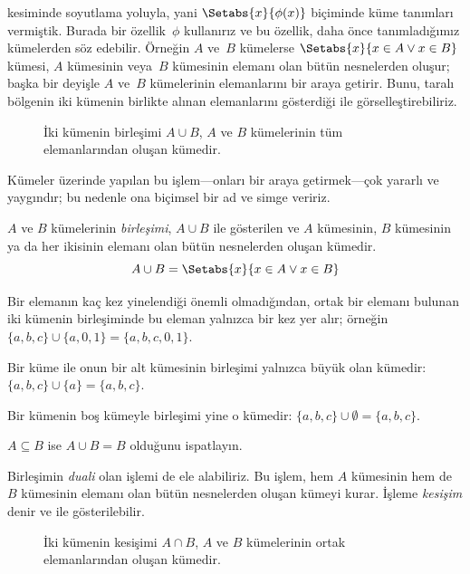 \documentclass[../../../include/open-logic-section]{subfiles}
\begin{document}

\begin{explain}
 kesiminde soyutlama yoluyla, yani
$\Setabs{x}{\phi(x)}$ biçiminde küme tanımları vermiştik. Burada bir
özellik~$\phi$ kullanırız ve bu özellik, daha önce tanımladığımız kümelerden
söz edebilir. Örneğin $A$ ve~$B$ kümelerse
$\Setabs{x}{x \in A \lor x \in B}$ kümesi, $A$ kümesinin veya~$B$ kümesinin elemanı
olan bütün nesnelerden oluşur; başka bir deyişle $A$ ve~$B$ kümelerinin
elemanlarını bir araya getirir. Bunu, taralı bölgenin iki kümenin birlikte
alınan elemanlarını gösterdiği  ile görselleştirebiliriz.

\begin{figure}
  \caption{İki kümenin birleşimi $A \cup B$, $A$ ve $B$ kümelerinin tüm
    elemanlarından oluşan kümedir.}
\end{figure}

Kümeler üzerinde yapılan bu işlem---onları bir araya getirmek---çok yararlı ve
yaygındır; bu nedenle ona biçimsel bir ad ve simge veririz.
\end{explain}

\begin{defn}[Birleşim]
$A$ ve $B$ kümelerinin \emph{birleşimi}, $A \cup B$ ile gösterilen ve $A$
kümesinin, $B$ kümesinin ya da her ikisinin elemanı olan bütün nesnelerden
oluşan kümedir.
\[
A \cup B = \Setabs{x}{x \in A \lor x \in B}
\]
\end{defn}

\begin{ex}
Bir elemanın kaç kez yinelendiği önemli olmadığından, ortak bir elemanı
bulunan iki kümenin birleşiminde bu eleman yalnızca bir kez yer alır; örneğin
$\{ a, b, c\} \cup \{ a, 0, 1\} = \{a, b, c, 0, 1\}$.

Bir küme ile onun bir alt kümesinin birleşimi yalnızca büyük olan kümedir:
$\{a, b, c \} \cup \{a \} = \{a, b, c\}$.

Bir kümenin boş kümeyle birleşimi yine o kümedir:
$\{a, b, c \} \cup \emptyset = \{a, b, c \}$.
\end{ex}

\begin{prob}
$A \subseteq B$ ise $A \cup B = B$ olduğunu ispatlayın.
\end{prob}

\begin{explain}
Birleşimin \emph{duali} olan işlemi de ele alabiliriz. Bu işlem, hem $A$
kümesinin hem de $B$ kümesinin elemanı olan bütün nesnelerden oluşan kümeyi kurar. İşleme
\emph{kesişim} denir ve  ile gösterilebilir.
\begin{figure}
  \caption{İki kümenin kesişimi $A \cap B$, $A$ ve $B$ kümelerinin ortak
    elemanlarından oluşan kümedir.}
\end{figure}
\end{explain}
\end{document}
